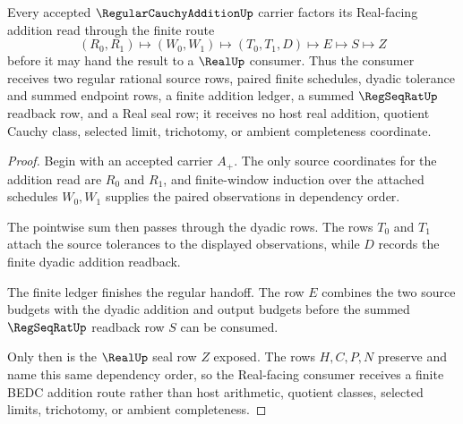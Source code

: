\begin{theorem}
\label{thm:regular-cauchy-addition-real-seal-handoff}
Every accepted $\RegularCauchyAdditionUp$ carrier factors its Real-facing addition read through the finite route
$$
(R_0,R_1)\longmapsto(W_0,W_1)\longmapsto(T_0,T_1,D)\longmapsto E\longmapsto S\longmapsto Z
$$
before it may hand the result to a $\RealUp$ consumer. Thus the consumer receives two regular rational source rows, paired finite schedules, dyadic tolerance and summed endpoint rows, a finite addition ledger, a summed $\RegSeqRatUp$ readback row, and a Real seal row; it receives no host real addition, quotient Cauchy class, selected limit, trichotomy, or ambient completeness coordinate.
\end{theorem}
\begin{proof}
Begin with an accepted carrier $A_+$. The only source coordinates for the addition read are $R_0$ and $R_1$, and finite-window induction over the attached schedules $W_0,W_1$ supplies the paired observations in dependency order.

The pointwise sum then passes through the dyadic rows. The rows $T_0$ and $T_1$ attach the source tolerances to the displayed observations, while $D$ records the finite dyadic addition readback.

The finite ledger finishes the regular handoff. The row $E$ combines the two source budgets with the dyadic addition and output budgets before the summed $\RegSeqRatUp$ readback row $S$ can be consumed.

Only then is the $\RealUp$ seal row $Z$ exposed. The rows $H,C,P,N$ preserve and name this same dependency order, so the Real-facing consumer receives a finite BEDC addition route rather than host arithmetic, quotient classes, selected limits, trichotomy, or ambient completeness.
\end{proof}

